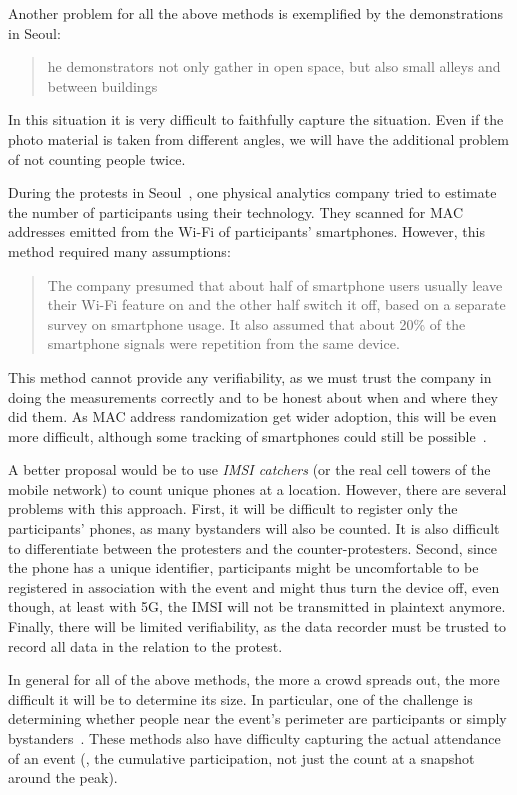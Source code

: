 Another problem for all the above methods is exemplified by the demonstrations 
in Seoul:
\blockcquote{2016DemonstrationsInSeoul}{%
  he demonstrators not only gather in open space, but also small 
  alleys and between buildings%
}.
In this situation it is very difficult to faithfully capture the situation.
Even if the photo material is taken from different angles, we will have the additional problem of not counting people twice.

During the protests in Seoul~\cite{2016DemonstrationsInSeoul}, one physical 
analytics company tried to estimate the number of participants using their 
technology.
They scanned for MAC addresses emitted from the Wi-Fi of participants' smartphones.
However, this method required many assumptions:
\blockcquote{2016DemonstrationsInSeoul}{%
  The company presumed that about half of smartphone users usually leave their Wi-Fi feature on and the other half switch it off, based on a separate survey on smartphone usage. 
It also assumed that about 20\% of the smartphone signals were repetition from the same device.
}
This method cannot provide any verifiability, as we must trust the company in doing the measurements correctly and to be honest about when and where they did them.
As MAC address randomization get wider adoption, this will be even more difficult, although some tracking of smartphones could still be possible~\cite{WhyMACRandomizationIsNotEnough}.

A better proposal would be to use \emph{IMSI catchers} (or the real cell towers of the mobile network) to count unique phones at a location.
However, there are several problems with this approach.
First, it will be difficult to register only the participants' phones, as many 
bystanders will also be counted.
It is also difficult to differentiate between the protesters and the counter-protesters.
Second, since the phone has a unique identifier, participants might be uncomfortable to be registered in association with the event and might thus turn the device off, even though, at least with 5G, the IMSI will not be
transmitted in plaintext anymore. %
Finally, there will be limited verifiability, as the data recorder must be trusted to record all data in the relation to the protest.

In general for all of the above methods, the more a crowd spreads out, the more 
difficult it will be to determine its size.
In particular, one of the challenge is determining whether people near the event's perimeter are participants or simply bystanders~\cite{HowToEstimateCrowdSize}.
These methods also have difficulty capturing the actual attendance of an event (\ie, the cumulative participation, not just the count at a snapshot around the peak).

